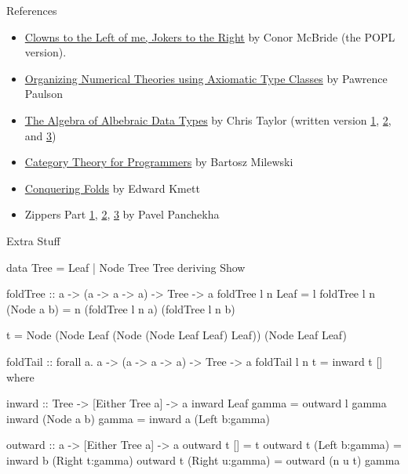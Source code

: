 \documentclass[ignorenonframetext,]{beamer}
\begin{document}
\begin{frame}[fragile]{References}

\begin{itemize}
\itemsep1pt\parskip0pt
\item
  \href{http://strictlypositive.org/CJ.pdf}{Clowns to the Left of me,
  Jokers to the Right} by Conor McBride (the POPL version).
\item
  \href{http://www.slideshare.net/lawrencepaulson/type-classes-slides}{Organizing
  Numerical Theories using Axiomatic Type Classes} by Pawrence Paulson
\item
  \href{https://www.youtube.com/watch?v=YScIPA8RbVE}{The Algebra of
  Albebraic Data Types} by Chris Taylor (written version
  \href{http://chris-taylor.github.io/blog/2013/02/10/the-algebra-of-algebraic-data-types/}{1},
  \href{http://chris-taylor.github.io/blog/2013/02/11/the-algebra-of-algebraic-data-types-part-ii/}{2},
  and
  \href{http://chris-taylor.github.io/blog/2013/02/13/the-algebra-of-algebraic-data-types-part-iii/}{3})
\item
  \href{http://bartoszmilewski.com/2014/10/28/category-theory-for-programmers-the-preface/}{Category
  Theory for Programmers} by Bartosz Milewski
\item
  \href{https://www.fpcomplete.com/user/edwardk/conquering-folds}{Conquering
  Folds} by Edward Kmett
\item
  Zippers Part
  \href{https://pavpanchekha.com/blog/zippers/huet.html}{1},
  \href{https://pavpanchekha.com/blog/zippers/derivative.html}{2},
  \href{https://pavpanchekha.com/blog/zippers/kiselyov.html}{3} by Pavel
  Panchekha
\end{itemize}

\end{frame}

\begin{frame}[fragile]{Extra Stuff}

\begin{haskellcode}
data Tree = Leaf | Node Tree Tree deriving Show

foldTree :: a -> (a -> a -> a) -> Tree -> a
foldTree l n Leaf = l
foldTree l n (Node a b) = n (foldTree l n a) (foldTree l n b)

t = Node (Node Leaf (Node (Node Leaf Leaf) Leaf)) (Node Leaf Leaf)
\end{haskellcode}

\pause

\begin{haskellcode}
foldTail :: forall a. a -> (a -> a -> a) -> Tree -> a
foldTail l n t = inward t []
    where

        inward :: Tree -> [Either Tree a] -> a
        inward Leaf       gamma = outward l gamma
        inward (Node a b) gamma = inward a (Left b:gamma)

        outward :: a -> [Either Tree a] -> a
        outward t [] = t
        outward t (Left b:gamma) = inward b (Right t:gamma)
        outward t (Right u:gamma) = outward (n u t) gamma
\end{haskellcode}

\end{frame}
\end{document}
